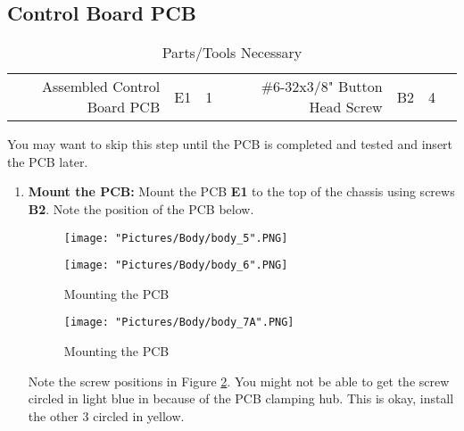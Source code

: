 \documentclass{article}
\begin{document}
\subsection{Control Board PCB}

\begin{table}[H]
    \centering
    \sffamily\footnotesize
    \caption{Parts/Tools Necessary}
    \begin{tabular}{|N|Q|Q|I|N|Q|Q|I|}
        \hline
         &  &  &  &  &  &  &  \\
        \hline
        Assembled Control Board PCB & E1 & 1 &  & \#6-32x3/8" Button Head Screw & B2 & 4 &  \\ \hline
    \end{tabular}
\end{table}

You may want to skip this step until the PCB is completed and tested and insert the PCB later. 

\begin{enumerate}

\item \textbf{Mount the PCB:} Mount the PCB \textbf{E1} to the top of the chassis using screws \textbf{B2}. Note the position of the PCB below.

\begin{figure}[H]
  \centering
  \begin{minipage}[b]{0.50\textwidth}
    \texttt{[image: "Pictures/Body/body\_5".PNG]}
  \end{minipage}
  \hfill
  \begin{minipage}[b]{0.40\textwidth}
    \texttt{[image: "Pictures/Body/body\_6".PNG]}
  \end{minipage}
  \caption{Mounting the PCB}
  \label{pcb}
\end{figure} 

\begin{figure}[H]
	\centering
	\texttt{[image: "Pictures/Body/body\_7A".PNG]}
  \caption{Mounting the PCB}
  \label{pcb2}
\end{figure}

Note the screw positions in Figure \ref{pcb2}. You might not be able to get the screw circled in light blue in because of the PCB clamping hub. This is okay, install the other 3 circled in yellow.

\end{enumerate}
\end{document}
